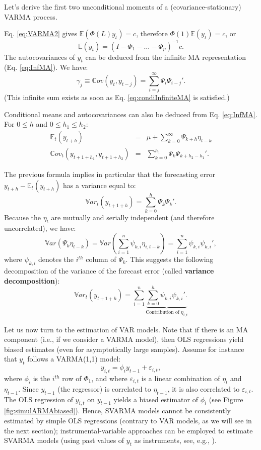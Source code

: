 \documentclass[
  12pt,
]{book}
\theoremstyle{definition}
\theoremstyle{definition}
\theoremstyle{definition}
\theoremstyle{definition}
\theoremstyle{remark}
\begin{document}
Let's derive the first two unconditional moments of a (covariance-stationary) VARMA process.

Eq. \eqref{eq:VARMA2} gives \(\mathbb{E}(\Phi(L)y_t)=c\), therefore \(\Phi(1)\mathbb{E}(y_t)=c\), or
\[
\mathbb{E}(y_t) = (I - \Phi_1 - \dots - \Phi_p)^{-1}c.
\]
The autocovariances of \(y_t\) can be deduced from the infinite MA representation (Eq. \eqref{eq:InfMA}). We have:
\[
\gamma_j \equiv \mathbb{C}ov(y_t,y_{t-j}) = \sum_{i=j}^\infty \Psi_i \Psi_{i-j}'.
\]
(This infinite sum exists as soon as Eq. \eqref{eq:condiInfiniteMA} is satisfied.)

Conditional means and autocovariances can also be deduced from Eq. \eqref{eq:InfMA}. For \(0 \le h\) and \(0 \le h_1 \le h_2\):
\begin{eqnarray*}
\mathbb{E}_t(y_{t+h}) &=& \mu + \sum_{k=0}^\infty \Psi_{k+h} \eta_{t-k} \\
\mathbb{C}ov_t(y_{t+1+h_1},y_{t+1+h_2}) &=& \sum_{k=0}^{h_1} \Psi_{k}\Psi_{k+h_2-h_1}'.
\end{eqnarray*}

The previous formula implies in particular that the forecasting error \(y_{t+h} - \mathbb{E}_t(y_{t+h})\) has a variance equal to:
\[
\mathbb{V}ar_t(y_{t+1+h}) = \sum_{k=0}^{h} \Psi_{k}\Psi_{k}'.
\]
Because the \(\eta_t\) are mutually and serially independent (and therefore uncorrelated), we have:
\[
\mathbb{V}ar(\Psi_k \eta_{t-k}) = \mathbb{V}ar\left(\sum_{i=1}^n \psi_{k,i} \eta_{i,t-k}\right)  = \sum_{i=1}^n \psi_{k,i}\psi_{k,i}',
\]
where \(\psi_{k,i}\) denotes the \(i^{th}\) column of \(\Psi_k\). This suggests the following decomposition of the variance of the forecast error (called \textbf{variance decomposition}):
\[
\mathbb{V}ar_t(y_{t+1+h}) = \sum_{i=1}^n \underbrace{\sum_{k=0}^{h}  \psi_{k,i}\psi_{k,i}'.}_{\mbox{Contribution of $\eta_{i,t}$}}
\]

Let us now turn to the estimation of VAR models. Note that if there is an MA component (i.e., if we consider a VARMA model), then OLS regressions yield biased estimates (even for asymptotically large samples). Assume for instance that \(y_t\) follows a VARMA(1,1) model:
\[
y_{i,t} = \phi_i y_{t-1} + \varepsilon_{i,t},
\]
where \(\phi_i\) is the \(i^{th}\) row of \(\Phi_1\), and where \(\varepsilon_{i,t}\) is a linear combination of \(\eta_t\) and \(\eta_{t-1}\). Since \(y_{t-1}\) (the regressor) is correlated to \(\eta_{t-1}\), it is also correlated to \(\varepsilon_{i,t}\). The OLS regression of \(y_{i,t}\) on \(y_{t-1}\) yields a biased estimator of \(\phi_i\) (see Figure \ref{fig:simulARMAbiased}). Hence, SVARMA models cannot be consistently estimated by simple OLS regressions (contrary to VAR models, as we will see in the next section); instrumental-variable approaches can be employed to estimate SVARMA models (using past values of \(y_t\) as instruments, see, e.g., \citet{Gourieroux_Monfort_Renne_2020}).
\end{document}
